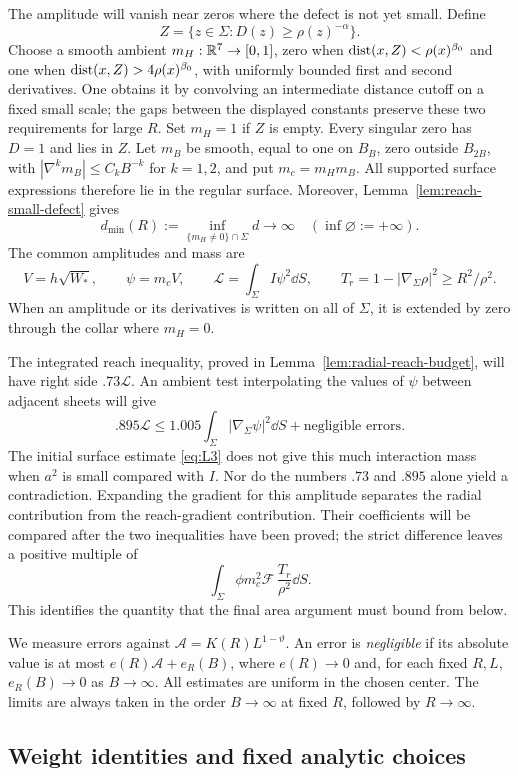 The amplitude will vanish near zeros where the defect is not yet small.
Define
\[
 Z=\{z\in\Sigma:D(z)\ge\rho(z)^{-\alpha}\}.
\]
Choose a smooth ambient $m_H:\mathbb R^7\to[0,1]$, zero when
$\operatorname{dist}(x,Z)<\rho(x)^{\beta_0}$ and one when
$\operatorname{dist}(x,Z)>4\rho(x)^{\beta_0}$, with uniformly bounded first and second
derivatives. One obtains it by convolving an intermediate distance
cutoff on a fixed small scale; the gaps between the displayed constants
preserve these two requirements for large $R$. Set $m_H=1$ if $Z$ is
empty. Every singular zero has $D=1$ and lies in $Z$.
Let $m_B$ be smooth, equal to one on $B_B$, zero outside $B_{2B}$,
with $|\nabla^km_B|\le C_kB^{-k}$ for $k=1,2$, and put $m_c=m_Hm_B$.
All supported surface expressions therefore lie in the regular surface.
Moreover, Lemma~\ref{lem:reach-small-defect} gives
\[
 d_{\min}(R):=\inf_{\{m_H\ne0\}\cap\Sigma}d\longrightarrow\infty
 \quad(\inf\varnothing:=+\infty).
\]
The common amplitudes and mass are
\[
 V=h\sqrt{W_*},\qquad \psi=m_cV,\qquad
 \mathcal L=\int_\Sigma I\psi^2\dd S,\qquad
 T_r=1-|\nabla_\Sigma\rho|^2\ge R^2/\rho^2.
\]
When an amplitude or its derivatives is written on all of $\Sigma$, it
is extended by zero through the collar where $m_H=0$.

The integrated reach inequality, proved in
Lemma~\ref{lem:radial-reach-budget}, will have right side
$.73\mathcal L$. An ambient test interpolating the values of $\psi$
between adjacent sheets will give
\[
 .895\mathcal L\le1.005\int_\Sigma|\nabla_\Sigma\psi|^2\dd S
       +\text{negligible errors}.
\]
The initial surface estimate \eqref{eq:L3} does not give this much
interaction mass when $a^2$ is small compared with $I$. Nor do the
numbers $.73$ and $.895$ alone yield a contradiction. Expanding the
gradient for this amplitude separates the radial
contribution from the reach-gradient contribution. Their coefficients
will be compared after the two inequalities have been proved; the strict
difference leaves a positive multiple of
\[
 \int_\Sigma\phi m_c^2\mathcal F\,\frac{T_r}{\rho^2}\dd S.
\]
This identifies the quantity that the final area argument must bound
from below.

We measure errors against $\mathcal A=K(R)L^{1-\vartheta}$.
An error is \emph{negligible} if its absolute value is at most
$e(R)\mathcal A+e_R(B)$, where $e(R)\to0$ and, for each fixed $R,L$,
$e_R(B)\to0$ as $B\to\infty$. All estimates are uniform in the chosen
center. The limits are always taken in the order $B\to\infty$ at fixed
$R$, followed by $R\to\infty$.

\subsection{Weight identities and fixed analytic choices}

